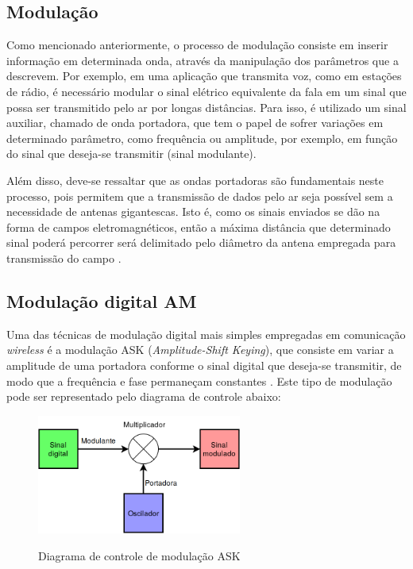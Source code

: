 \documentclass[oneside,openright,12pt]{ufsm_2015} %
\begin{document}
\subsection{Modulação}
Como mencionado anteriormente, o processo de modulação consiste em inserir informação em determinada onda, através da manipulação dos parâmetros que a descrevem. Por exemplo, em uma aplicação que transmita voz, como em estações de rádio, é necessário modular o sinal elétrico equivalente da fala em um sinal que possa ser transmitido pelo ar por longas distâncias. Para isso, é utilizado um sinal auxiliar, chamado de onda portadora, que tem o papel de sofrer variações em determinado parâmetro, como frequência ou amplitude, por exemplo, em função do sinal que deseja-se transmitir (sinal modulante). 

Além disso, deve-se ressaltar que as ondas portadoras são fundamentais neste processo, pois permitem que a transmissão de dados pelo ar seja possível sem a necessidade de antenas gigantescas. Isto é, como os sinais enviados se dão na forma de campos eletromagnéticos, então a máxima distância que determinado sinal poderá percorrer será delimitado pelo diâmetro da antena empregada para transmissão do campo \cite{book:1681103}.

\subsection{Modulação digital AM}
Uma das técnicas de modulação digital mais simples empregadas em comunicação \textit{wireless} é a modulação ASK (\textit{Amplitude-Shift Keying}), que consiste em variar a amplitude de uma portadora conforme o sinal digital que deseja-se transmitir, de modo que a frequência e fase permaneçam constantes \cite{book:1039396}. Este tipo de modulação pode ser representado pelo diagrama de controle abaixo:
\begin{figure}[ht]
     \caption{\label{exepretex} Diagrama de controle de modulação ASK}
\centering
\includegraphics[width=0.6\textwidth]{figuras/ask-control.png}
\vspace{\baselineskip} %
    \label{fig:ask-control}
\end{figure}
\end{document}

